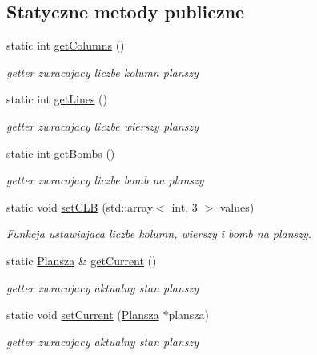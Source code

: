 \subsection*{Statyczne metody publiczne}
\begin{DoxyCompactItemize}
\item 
static int \hyperlink{class_plansza_a606c563302f64d39fa3542874aed744e}{get\+Columns} ()
\begin{DoxyCompactList}\small\item\em getter zwracajacy liczbe kolumn planszy \end{DoxyCompactList}\item 
static int \hyperlink{class_plansza_a61d0d0599fa772b75f633089a4d3b12a}{get\+Lines} ()
\begin{DoxyCompactList}\small\item\em getter zwracajacy liczbe wierszy planszy \end{DoxyCompactList}\item 
static int \hyperlink{class_plansza_a8d3c8a148a2b88969b04b661ca833de7}{get\+Bombs} ()
\begin{DoxyCompactList}\small\item\em getter zwracajacy liczbe bomb na planszy \end{DoxyCompactList}\item 
static void \hyperlink{class_plansza_a9b25d696343a129d729ce30ae7f51ca5}{set\+C\+L\+B} (std\+::array$<$ int, 3 $>$ values)
\begin{DoxyCompactList}\small\item\em Funkcja ustawiajaca liczbe kolumn, wierszy i bomb na planszy. \end{DoxyCompactList}\item 
static \hyperlink{class_plansza}{Plansza} \& \hyperlink{class_plansza_a1d6102fbb776fbc59d83e32c425567e8}{get\+Current} ()
\begin{DoxyCompactList}\small\item\em getter zwracajacy aktualny stan planszy \end{DoxyCompactList}\item 
static void \hyperlink{class_plansza_a4f2b71f1200d71fd32987b107c17dba1}{set\+Current} (\hyperlink{class_plansza}{Plansza} $\ast$plansza)
\begin{DoxyCompactList}\small\item\em getter zwracajacy aktualny stan planszy \end{DoxyCompactList}\end{DoxyCompactItemize}


